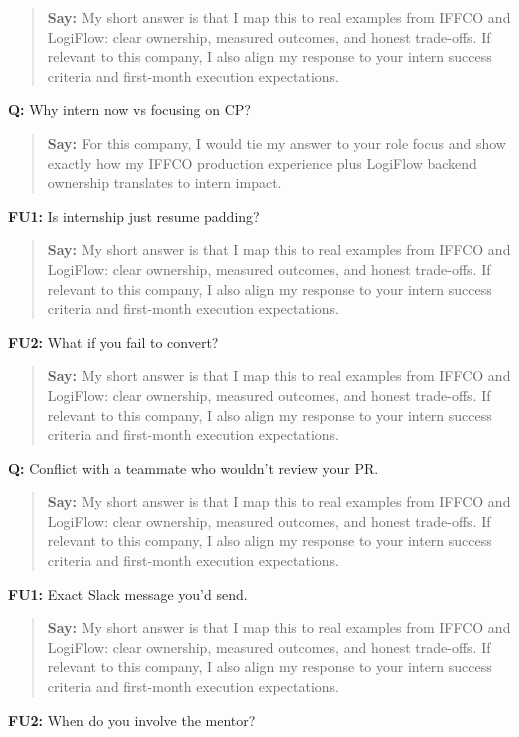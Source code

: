 \documentclass[9pt,a4paper]{article}
\begin{document}
\begin{quote}\small\textbf{Say:} My short answer is that I map this to real examples from IFFCO and LogiFlow: clear ownership, measured outcomes, and honest trade-offs. If relevant to this company, I also align my response to your intern success criteria and first-month execution expectations.\end{quote}
\vspace{2mm}
\textbf{Q:} Why intern now vs focusing on CP?

\begin{quote}\small\textbf{Say:} For this company, I would tie my answer to your role focus and show exactly how my IFFCO production experience plus LogiFlow backend ownership translates to intern impact.\end{quote}
\vspace{2mm}
\textbf{FU1:} Is internship just resume padding?

\begin{quote}\small\textbf{Say:} My short answer is that I map this to real examples from IFFCO and LogiFlow: clear ownership, measured outcomes, and honest trade-offs. If relevant to this company, I also align my response to your intern success criteria and first-month execution expectations.\end{quote}
\vspace{2mm}
\textbf{FU2:} What if you fail to convert?

\begin{quote}\small\textbf{Say:} My short answer is that I map this to real examples from IFFCO and LogiFlow: clear ownership, measured outcomes, and honest trade-offs. If relevant to this company, I also align my response to your intern success criteria and first-month execution expectations.\end{quote}
\vspace{2mm}
\textbf{Q:} Conflict with a teammate who wouldn't review your PR.

\begin{quote}\small\textbf{Say:} My short answer is that I map this to real examples from IFFCO and LogiFlow: clear ownership, measured outcomes, and honest trade-offs. If relevant to this company, I also align my response to your intern success criteria and first-month execution expectations.\end{quote}
\vspace{2mm}
\textbf{FU1:} Exact Slack message you'd send.

\begin{quote}\small\textbf{Say:} My short answer is that I map this to real examples from IFFCO and LogiFlow: clear ownership, measured outcomes, and honest trade-offs. If relevant to this company, I also align my response to your intern success criteria and first-month execution expectations.\end{quote}
\vspace{2mm}
\textbf{FU2:} When do you involve the mentor?
\end{document}
